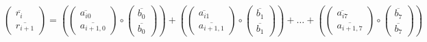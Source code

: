 \documentclass[
11pt,%
tightenlines,%
twoside,%
onecolumn,%
nofloats,%
nobibnotes,%
nofootinbib,%
superscriptaddress,%
noshowpacs,%
centertags]%
{revtex4}
\begin{document}
\begin{equation}
\begin{pmatrix} \overline{r_i} \\ \overline{r_{i+1}} \end{pmatrix}
=
\left(
\begin{pmatrix} \overline{a_{i0}} \\ \overline{a_{i+1,0}} \end{pmatrix}
\circ
\begin{pmatrix} \overline{b_0} \\ \overline{b_0} \end{pmatrix}
\right)
+
\left(
\begin{pmatrix} \overline{a_{i1}} \\ \overline{a_{i+1,1}} \end{pmatrix}
\circ
\begin{pmatrix} \overline{b_1} \\ \overline{b_1} \end{pmatrix}
\right)
+
\ldots
+
\left(
\begin{pmatrix} \overline{a_{i7}} \\ \overline{a_{i+1,7}} \end{pmatrix}
\circ
\begin{pmatrix} \overline{b_7} \\ \overline{b_7} \end{pmatrix}
\right)
\end{equation}
\end{document}
